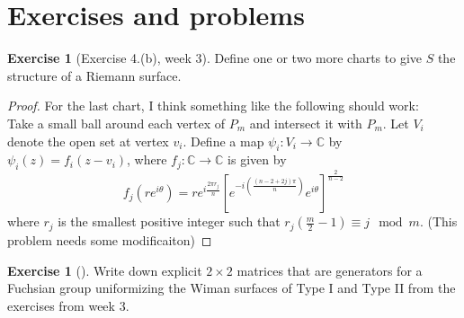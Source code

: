 \documentclass[reqno]{amsart}
\theoremstyle{definition}
\newtheorem{exercise}[theorem]{Exercise}
\theoremstyle{remark}
\begin{document}
\section{Exercises and problems}

\begin{exercise}[Exercise 4.(b), week 3]
    Define one or two more charts to give $S$ the structure of a Riemann
        surface.
\end{exercise}

\begin{proof}
    For the last chart, I think something like the following should work:\\
    Take a small ball around each vertex of $P_m$ and intersect it
        with $P_m$. Let $V_i$ denote the open set at vertex $v_i$.
        Define a map $\psi_i \colon V_i \to \mathbb{C}$ by
        $\psi_i (z) = f_i \left( z - v_i \right) $, where
        $f_j \colon \mathbb{C} \to \mathbb{C}$ is given by
        \[
        f_j(re^{i \theta} ) = r e^{i \frac{2 \pi r_j}{n}} \left[ 
        e^{- i \left( \frac{(n-2 + 2j)\pi}{n} \right) } e^{i \theta}\right]^{\frac{2}{n-2}}
        \] 
        where $r_j$ is the smallest positive integer such that
        $r_j \left( \frac{m}{2}-1 \right) \equiv j \mod{m} $. (This problem needs some modificaiton)
\end{proof}

\begin{exercise}[]\label{fuchsian-group-for-wiman-surfaces}
        Write down explicit $2 \times 2$ matrices that are generators for
        a Fuchsian group uniformizing the Wiman surfaces of Type I and Type
        II from the exercises from week 3.
    \end{exercise}
\end{document}
